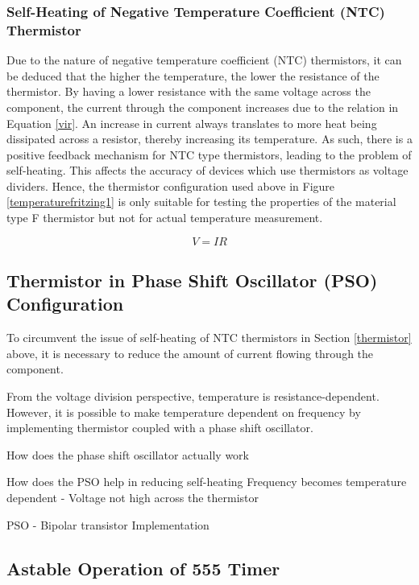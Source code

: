 \subsubsection{Self-Heating of Negative Temperature Coefficient (NTC) Thermistor}
Due to the nature of negative temperature coefficient (NTC) thermistors, it can be deduced that the higher the temperature, the lower the resistance of the thermistor. By having a lower resistance with the same voltage across the component, the current through the component increases due to the relation in Equation \ref{vir}. An increase in current always translates to more heat being dissipated across a resistor, thereby increasing its temperature. As such, there is a positive feedback mechanism for NTC type thermistors, leading to the problem of self-heating. This affects the accuracy of devices which use thermistors as voltage dividers. Hence, the thermistor configuration used above in Figure \ref{temperaturefritzing1} is only suitable for testing the properties of the material type F thermistor but not for actual temperature measurement.  

\begin{equation}
 V=IR
 \label{vir}
\end{equation} 

\subsection{Thermistor in Phase Shift Oscillator (PSO) Configuration}

To circumvent the issue of self-heating of NTC thermistors in Section \ref{thermistor} above, it is necessary to reduce the amount of current flowing through the component. 

From the voltage division perspective, temperature is resistance-dependent. However, it is possible to make temperature dependent on frequency by implementing thermistor coupled with a phase shift oscillator.  

\cite{psotutorial}






How does the phase shift oscillator actually work

How does the PSO help in reducing self-heating
Frequency becomes temperature dependent - Voltage not high across the thermistor 

PSO - Bipolar transistor Implementation \cite{psotutorial}

\subsection{Astable Operation of 555 Timer}

